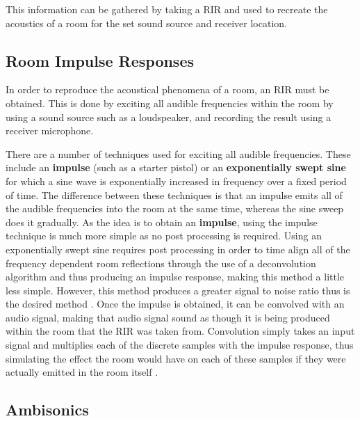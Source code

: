 \documentclass[../../main.tex]{subfiles}
\begin{document}
		This information can be gathered by taking a \ac{RIR} and used to recreate the acoustics of a room for the set sound source and receiver location.

	\subsection{Room Impulse Responses}

		In order to reproduce the acoustical phenomena of a room, an \ac{RIR} must be obtained. This is done by exciting all audible frequencies within the room by using a sound source such as a loudspeaker, and recording the result using a receiver microphone.

		There are a number of techniques used for exciting all audible frequencies. These include an \textbf{impulse} (such as a starter pistol) or an \textbf{exponentially swept sine} for which a sine wave is exponentially increased in frequency over a fixed period of time. The difference between these techniques is that an impulse emits all of the audible frequencies into the room at the same time, whereas the sine sweep does it gradually. As the idea is to obtain an \textbf{impulse}, using the impulse technique is much more simple as no post processing is required. Using an exponentially swept sine requires post processing in order to time align all of the frequency dependent room reflections through the use of a deconvolution algorithm and thus producing an impulse response, making this method a little less simple. However, this method produces a greater signal to noise ratio thus is the desired method \cite{Stan2002}. Once the impulse is obtained, it can be convolved with an audio signal, making that audio signal sound as though it is being produced within the room that the \ac{RIR} was taken from. Convolution simply takes an input signal and multiplies each of the discrete samples with the impulse response, thus simulating the effect the room would have on each of these samples if they were actually emitted in the room itself \cite{Smith2003}.

	\subsection{Ambisonics}


\end{document}
